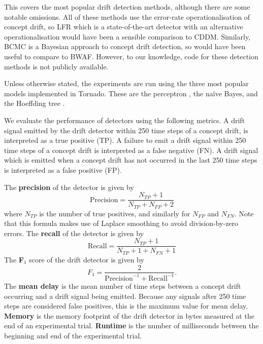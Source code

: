 This covers the most popular drift detection methods, although there are some notable omissions. All of these methods use the error-rate operationalisation of concept drift, so LFR \cite{LFR} which is a state-of-the-art detector with an alternative operationalisation would have been a sensible comparison to CDDM. Similarly, BCMC is a Bayesian approach to concept drift detection, so would have been useful to compare to BWAF. However, to our knowledge, code for these detection methods is not publicly available.

Unless otherwise stated, the experiments are run using the three most popular models implemented in Tornado. These are the perceptron \cite{perceptron}, the na\"{i}ve Bayes, and the Hoeffding tree \cite{hoeffding_trees}.

We evaluate the performance of detectors using the following metrics. A drift signal emitted by the drift detector within 250 time steps of a concept drift, is interpreted as a true positive (TP). A failure to emit a drift signal within 250 time steps of a concept drift is interpreted as a false negative (FN). A drift signal which is emitted when a concept drift has not occurred in the last 250 time steps is interpreted as a false positive (FP).  

The {\bf precision} of the detector is given by
\begin{equation}
    \text{Precision} = \frac{N_{TP}+1}{N_{TP}+N_{FP}+2}
\end{equation}
where $N_{TP}$ is the number of true positives, and similarly for $N_{FP}$ and $N_{FN}$. Note that this formula makes use of Laplace smoothing to avoid division-by-zero errors. The {\bf recall} of the detector is given by
\begin{equation}
    \text{Recall} = \frac{N_{TP}+1}{N_{TP}+1+N_{FN}+1}
\end{equation}
The {\bf F$_1$} score of the drift detector is given by
\begin{equation}
    F_1 = \frac{2}{\text{Precision}^{-1}+\text{Recall}^{-1}}.
\end{equation}
The {\bf mean delay} is the mean number of time steps between a concept drift occurring and a drift signal being emitted. Because any signals after 250 time steps are considered false positives, this is the maximum value for mean delay. {\bf Memory} is the memory footprint of the drift detector in bytes measured at the end of an experimental trial. {\bf Runtime} is the number of milliseconds between the beginning and end of the experimental trial.

